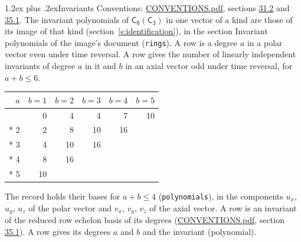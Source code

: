 \documentclass[10pt,a4paper]{article}
\makeatletter
\renewcommand\section{\@startsection{section}{1}{\z@}{-3ex plus -1ex minus -.2ex}%
  {1.2ex plus .2ex}{\normalfont\large\sffamily\bfseries\color{parttitle}}}
\numberwithin{equation}{section}
\newcommand{\grp}[1]{\mathsf{#1}}
\makeatother
\begin{document}
\section{Invariants}\label{s:invariants}
Conventions: \href{../../CONVENTIONS.pdf}{CONVENTIONS.pdf}, sections \href{../../CONVENTIONS.pdf\#conv.31.2}{31.2} and \href{../../CONVENTIONS.pdf\#conv.35.1}{35.1}.
The invariant polynomials of $\grp{C_{6}}(\grp{C_{3}})$ in one vector of a kind are those of its image of that kind (section~\ref{s:identification}), in the section Invariant polynomials of the image's document (\texttt{rings}).
\leavevmode\label{n:index.degree.polar}\label{n:index.degree.axial}A row is a degree $a$ in a polar vector even under time reversal. A row gives the number of linearly independent invariants of degree $a$ in it and $b$ in an axial vector odd under time reversal, for $a + b \le 6$.
{\small\begin{longtable}{@{}rrrrrr@{}}\toprule
$a$ & $b = 1$ & $b = 2$ & $b = 3$ & $b = 4$ & $b = 5$\\\midrule\endhead
\bottomrule\endfoot\endlastfoot
1 & 0 & 4 & 4 & 7 & 10\\*
2 & 2 & 8 & 10 & 16 & \\*
3 & 4 & 10 & 16 &  & \\*
4 & 8 & 16 &  &  & \\*
5 & 10 &  &  &  & \\
\bottomrule\end{longtable}}
\leavevmode\label{n:local.component.polar}\label{n:local.component.axial}The record holds their bases for $a + b \le 4$ (\texttt{polynomials}), in the components $u_{x}$, $u_{y}$, $u_{z}$ of the polar vector and $v_{x}$, $v_{y}$, $v_{z}$ of the axial vector. \label{n:head.polynomial}A row is an invariant of the reduced row echelon basis of its degrees (\href{../../CONVENTIONS.pdf}{CONVENTIONS.pdf}, section \href{../../CONVENTIONS.pdf\#conv.35.1}{35.1}). A row gives its degrees $a$ and $b$ and the invariant (polynomial).
\end{document}
